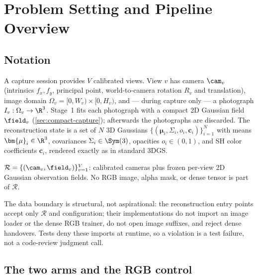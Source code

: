 \section{Problem Setting and Pipeline Overview}
\label{sec:setting}

\subsection{Notation}
\label{sec:notation}

A capture session provides $V$ calibrated views.  View $v$ has camera $\cam_v$ (intrinsics
$f_x, f_y$, principal point, world-to-camera rotation $R_v$ and translation), image domain
$\Omega_v = [0, W_v) \times [0, H_v)$, and --- during capture only --- a photograph
$I_v : \Omega_v \to \R^3$.  Stage~1 fits each photograph with a compact 2D Gaussian field
$\field_v$ (\cref{sec:compact-capture}); afterwards the photographs are discarded.  The
reconstruction state is a set of $N$ 3D Gaussians
$\{(\bm{\mu}_i, \Sigma_i, o_i, \bm{c}_i)\}_{i=1}^{N}$ with means
$\bm{\mu}_i \in \R^3$, covariances $\Sigma_i \in \Sym(3)$, opacities $o_i \in (0,1)$, and
SH color coefficients $\bm{c}_i$, rendered exactly as in standard 3DGS.

\begin{definition}
\label{def:recon-inputs}
$\mathcal{R} = \{(\cam_v, \field_v)\}_{v=1}^{V}$: calibrated cameras plus frozen per-view 2D
Gaussian observation fields.  No RGB image, alpha mask, or dense tensor is part of
$\mathcal{R}$.
\end{definition}

The data boundary is structural, not aspirational: the reconstruction entry points accept only
$\mathcal{R}$ and configuration; their implementations do not import an image loader or the
dense RGB trainer, do not open image suffixes, and reject dense handovers.  Tests deny these
imports at runtime, so a violation is a test failure, not a code-review judgment
call.

\subsection{The two arms and the RGB control}
\label{sec:arms}

